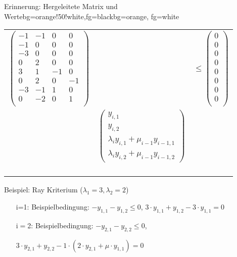 \begin{frame}
	\begin{variableblock}{Erinnerung: Hergeleitete Matrix und Werte}{bg=orange!50!white,fg=black}{bg=orange, fg=white}
	\begin{tabular}{rll}
		\multirow{2}{*}{$\begin{pmatrix}
			-1 		& -1 		&  0		& 0		 \\
			-1 		& 0 		&  0		& 0		 \\
			-3 		& 0 		&  0		& 0		 \\
			0 		& 2 		&  0		& 0		 \\
			3 		& 1 		&  -1		& 0		 \\
			0 		& 2 		&  0		& -1	 \\
			-3 		& -1 		&  1		& 0		 \\
			0 		& -2 		&  0		& 1	 	 \\
			\end{pmatrix}$}& &\multirow{2}{*}{$ \le \begin{pmatrix}
			0 \\ 0 \\ 0 \\ 0 \\ 0 \\ 0 \\ 0 \\ 0 \\ 
			\end{pmatrix} $}\\
		& & \\
		& \multirow{2}{*}{$\begin{pmatrix}
			y_{i,1} \\ y_{i,2} \\ \lambda_iy_{i,1}+\mu_{i-1}y_{i-1,1} \\ \lambda_iy_{i,2}+\mu_{i-1}y_{i-1,2}
			\end{pmatrix} $} & \\
		& & \\
		& & \\
		& & \\
		& & \\
		& & \\
	\end{tabular}
	\end{variableblock}
	\vspace*{-.5em}
	\begin{exampleblock}{Beispiel: Ray Kriterium ($\lambda_1 = 3,\lambda_2 = 2$) }
		\begin{itemize}
			\setlength{\itemindent}{0.25cm}
			\item[i=1:] Beispielbedingung: $-y_{1,1}-y_{1,2} \le 0$, $3\cdot y_{1,1}+y_{1,2}-3\cdot y_{1,1}=0$
			\item[i$=$2:] Beispielbedingung: $-y_{2,1}-y_{2,2} \le 0$, 
			\item[] $3\cdot y_{2,1}+y_{2,2}-1\cdot (2\cdot y_{2,1}+\mu\cdot y_{1,1})=0$
		\end{itemize}
	\end{exampleblock}
\end{frame}




